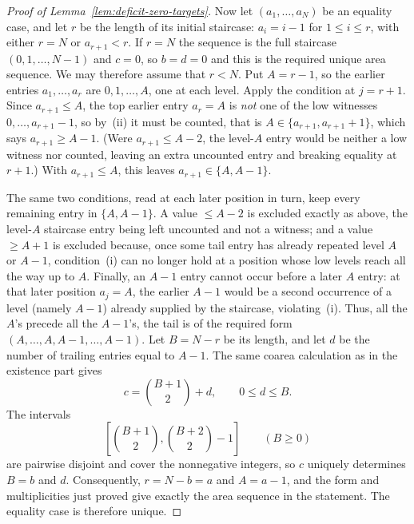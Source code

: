 \documentclass[11pt]{article}
\theoremstyle{definition}
\begin{document}
\begin{proof}[Proof of Lemma~\ref{lem:deficit-zero-targets}]
Now let $(a_1,\ldots,a_N)$ be an equality case, and let $r$ be the length of its
initial staircase: $a_i=i-1$ for $1\le i\le r$, with either $r=N$ or
$a_{r+1}<r$.  If $r=N$ the sequence is the full staircase $(0,1,\ldots,N-1)$ and
$c=0$, so $b=d=0$ and this is the required unique area sequence.  We may
therefore assume that $r<N$.  Put $A=r-1$, so the earlier entries
$a_1,\ldots,a_r$ are
$0,1,\ldots,A$, one at each level.  Apply the condition at $j=r+1$.  Since
$a_{r+1}\le A$, the top earlier entry $a_r=A$ is \emph{not} one of the low
witnesses $0,\ldots,a_{r+1}-1$, so by~(ii) it must be counted, that is
$A\in\{a_{r+1},a_{r+1}+1\}$, which says $a_{r+1}\ge A-1$.  (Were
$a_{r+1}\le A-2$, the level-$A$ entry would be neither a low witness nor counted,
leaving an extra uncounted entry and breaking equality at $r+1$.)  With
$a_{r+1}\le A$, this leaves $a_{r+1}\in\{A,A-1\}$.

The same two conditions, read at each later position in turn, keep every
remaining entry in $\{A,A-1\}$.  A value $\le A-2$ is excluded exactly as above,
the level-$A$ staircase entry being left uncounted and not a witness; and a value
$\ge A+1$ is excluded because, once some tail entry has already repeated level
$A$ or $A-1$, condition~(i) can no longer hold at a position whose low levels
reach all the way up to $A$.  Finally, an $A-1$ entry cannot occur before a later
$A$ entry: at that later position $a_j=A$, the earlier $A-1$ would be a second
occurrence of a level (namely $A-1$) already supplied by the staircase,
violating~(i).  Thus, all the $A$'s precede all the $A-1$'s, the tail is
of the required form $(A,\ldots,A,A-1,\ldots,A-1)$.  Let $B=N-r$ be its
length, and let $d$ be the number of trailing entries equal to $A-1$.  The
same coarea calculation as in the existence part gives
\[
  c=\binom{B+1}{2}+d,\qquad 0\le d\le B.
\]
The intervals
\[
  \left[\binom{B+1}{2},\binom{B+2}{2}-1\right]\qquad(B\ge0)
\]
are pairwise disjoint and cover the nonnegative integers, so $c$ uniquely
determines $B=b$ and $d$.  Consequently, $r=N-b=a$ and $A=a-1$, and the form
and multiplicities just proved give exactly the area sequence in the
statement.  The equality case is therefore unique.
\end{proof}
\end{document}
